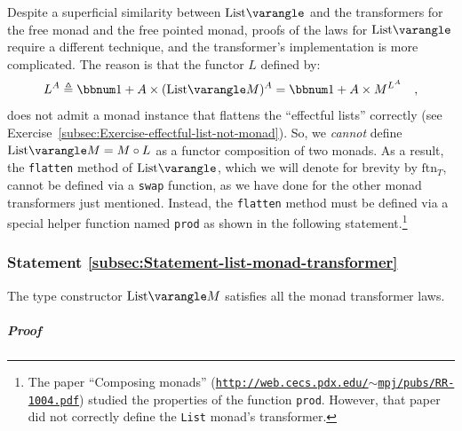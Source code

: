 Despite a superficial similarity between $\text{List}\varangle$ and
the transformers for the free monad and the free pointed monad, proofs
of the laws for $\text{List}\varangle$ require a different technique,
and the transformer\textsf{'}s implementation is more complicated. The reason
is that the functor $L$ defined by:
\[
L^{A}\triangleq\bbnum 1+A\times(\text{List}\varangle M)^{A}=\bbnum 1+A\times M^{L^{A}}\quad,
\]
does not admit a monad instance that flattens the \textsf{``}effectful lists\textsf{''}
correctly (see Exercise~\ref{subsec:Exercise-effectful-list-not-monad}).
So, we \emph{cannot} define $\text{List}\varangle M=M\circ L$ as
a functor composition of two monads. As a result, the \lstinline!flatten!
method of $\text{List}\varangle$, which we will denote for brevity
by $\text{ftn}_{T}$, cannot be defined via a \lstinline!swap! function,
as we have done for the other monad transformers just mentioned. Instead,
the \lstinline!flatten! method must be defined via a special helper
function named \lstinline!prod! as shown in the following statement.\footnote{The paper \textsf{``}Composing monads\textsf{''} (\texttt{\href{http://web.cecs.pdx.edu/~mpj/pubs/RR-1004.pdf}{http://web.cecs.pdx.edu/$\sim$mpj/pubs/RR-1004.pdf}})
studied the properties of the function \lstinline!prod!. However,
that paper did not correctly define the \lstinline!List! monad\textsf{'}s
transformer.}

\subsubsection{Statement \label{subsec:Statement-list-monad-transformer}\ref{subsec:Statement-list-monad-transformer}}

The type constructor $\text{List}\varangle M$ satisfies all the monad
transformer laws.

\subparagraph{Proof}


